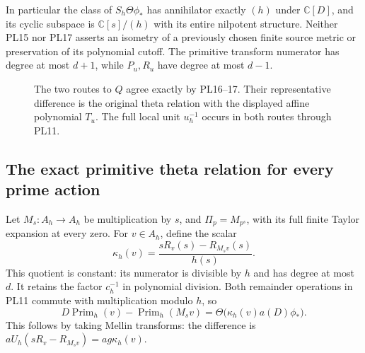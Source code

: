 \documentclass[11pt,a4paper]{article}
\theoremstyle{definition}\newtheorem{definition}[theorem]{Definition}
\newcommand{\C}{\mathbb C}\newcommand{\R}{\mathbb R}
\begin{document}
In particular the class of \(S_h\Theta\phi_*\) has annihilator
exactly \((h)\) under \(\C[D]\), and its cyclic subspace is
\(\C[s]/(h)\) with its entire nilpotent structure.
Neither PL15 nor PL17 asserts an isometry of a previously chosen
finite source metric or preservation of its polynomial cutoff.
The primitive transform numerator has degree at most \(d+1\),
while \(P_u,R_u\) have degree at most \(d-1\).

\begin{figure}[ht]\centering
{}
\caption{The two routes to \(Q\) agree exactly by PL16--17.
Their representative difference is the original theta relation with
the displayed affine polynomial \(T_u\). The full local unit
\(u_h^{-1}\) occurs in both routes through PL11.}
\end{figure}

\subsection{The exact primitive theta relation for every prime action}
Let \(M_s:A_h\to A_h\) be multiplication by \(s\), and
\(\Pi_p=M_{p^s}\), with its full finite Taylor expansion at every zero.
For \(v\in A_h\), define the scalar
\[
 \kappa_h(v)=\frac{sR_v(s)-R_{M_sv}(s)}{h(s)}.
 \tag{PL19}\label{pl:pl:kappa}
\]
This quotient is constant: its numerator is divisible by \(h\)
and has degree at most \(d\). It retains the factor \(c_h^{-1}\)
in polynomial division. Both remainder operations in PL11 commute
with multiplication modulo \(h\), so
\[
 D\operatorname{Prim}_h(v)-\operatorname{Prim}_h(M_sv)
          =\Theta\bigl(\kappa_h(v)a(D)\phi_*\bigr).
 \tag{PL20}\label{pl:pl:D-defect}
\]
This follows by taking Mellin transforms: the difference is
\(aU_h(sR_v-R_{M_sv})=a g\kappa_h(v)\).
\end{document}
